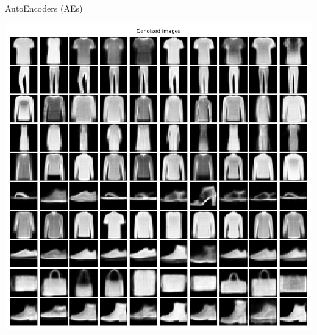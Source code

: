 \begin{frame}[allowframebreaks]{AutoEncoders (AEs)}
\begin{center}
\begin{minipage}{0.32\textwidth}
        \end{minipage}
        \begin{minipage}{0.32\textwidth}
            \includegraphics[width=\textwidth]{../resources/ae/fashion_mnist_denoised.png}
        \end{minipage}
    \end{center}
\end{frame}

